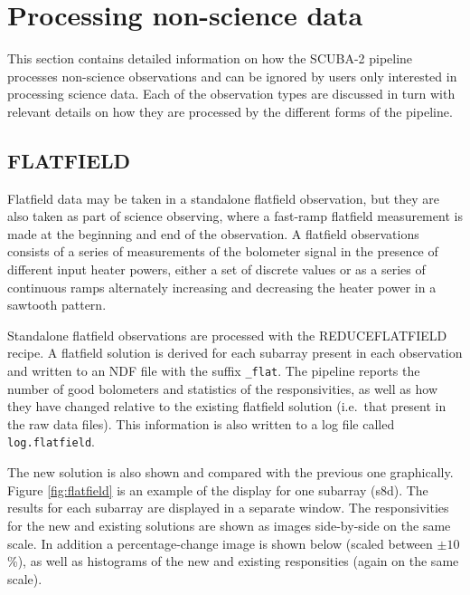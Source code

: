 \documentclass[twoside,11pt]{article}
\newcommand{\xlabel}[1]{}
\renewcommand{\_}{\texttt{\symbol{95}}}
\newcommand{\task}[1]{\textsf{#1}}
\begin{document}
\section{\xlabel{nonscience}Processing non-science data\label{se:nonsci}}

This section contains detailed information on how the SCUBA-2 pipeline
processes non-science observations and can be ignored by users only
interested in processing science data. Each of the observation types
are discussed in turn with relevant details on how they are processed
by the different forms of the pipeline.

\subsection{FLATFIELD}

Flatfield data may be taken in a standalone flatfield observation, but
they are also taken as part of science observing, where a fast-ramp
flatfield measurement is made at the beginning and end of the
observation. A flatfield observations consists of a series of
measurements of the bolometer signal in the presence of different
input heater powers, either a set of discrete values or as a series of
continuous ramps alternately increasing and decreasing the heater
power in a sawtooth pattern.

Standalone flatfield observations are processed with the
\task{REDUCE\_FLATFIELD} recipe. A flatfield solution is derived for
each subarray present in each observation and written to an NDF file
with the suffix \verb+_flat+. The pipeline reports the number of good
bolometers and statistics of the responsivities, as well as how they
have changed relative to the existing flatfield solution (i.e.\ that
present in the raw data files). This information is also written to a
log file called \verb+log.flatfield+.

The new solution is also shown and compared with the previous one
graphically. Figure \ref{fig:flatfield} is an example of the display
for one subarray (s8d). The results for each subarray are displayed in
a separate window. The responsivities for the new and existing
solutions are shown as images side-by-side on the same scale. In
addition a percentage-change image is shown below (scaled between
$\pm10$\,\%), as well as histograms of the new and existing
responsities (again on the same scale).
\end{document}

